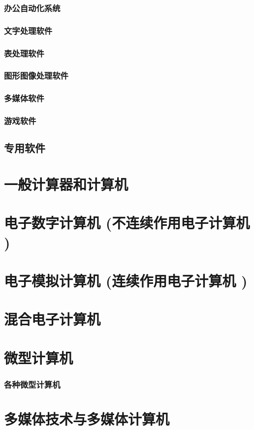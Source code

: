 \documentclass[UTF8]{../../ApplicationUniverse}
\begin{document}
        \subsubsection{办公自动化系统}
        \subsubsection{文字处理软件}
        \subsubsection{表处理软件}
        \subsubsection{图形图像处理软件}
        \subsubsection{多媒体软件}
        \subsubsection{游戏软件}
    \subsection{专用软件}
\section{一般计算器和计算机}
\section{电子数字计算机 (不连续作用电子计算机 )}
\section{电子模拟计算机 (连续作用电子计算机 )}
\section{混合电子计算机}
\section{微型计算机}
    \subsubsection{各种微型计算机}
\section{多媒体技术与多媒体计算机}
\end{document}
